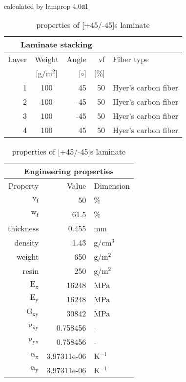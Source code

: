 \begin{table}[!htbp]
  \renewcommand{\arraystretch}{1.2}
  \caption{\label{tab:[+45/-45]s laminate}properties of [+45/-45]s laminate}
  \centering\footnotesize{\rule{0pt}{10pt}
  \tiny calculated by lamprop 4.0α1\\[3pt]}
    \begin{tabular}[t]{rcrrl}
      \multicolumn{4}{c}{\small\textbf{Laminate stacking}}\\[0.1em]
      \toprule %
      Layer & Weight & Angle & vf & Fiber type\\
            & [g/m$^2$] & [$\circ$] & [\%]\\
      \midrule
      1 &  100 &    45 & 50 & Hyer's carbon fiber\\
      2 &  100 &   -45 & 50 & Hyer's carbon fiber\\
      3 &  100 &   -45 & 50 & Hyer's carbon fiber\\
      4 &  100 &    45 & 50 & Hyer's carbon fiber\\
      \bottomrule
    \end{tabular}\hspace{0.02\textwidth}
    \begin{tabular}[t]{rrl}
      \multicolumn{3}{c}{\small\textbf{Engineering properties}}\\[0.1em]
      \toprule
      Property & Value & Dimension\\
      \midrule
      $\mathrm{v_f}$ & 50 &\%\\
      $\mathrm{w_f}$ & 61.5 &\%\\
      thickness & 0.455 & mm\\
      density & 1.43 & g/cm$^3$\\
      weight & 650 & g/m$^2$\\
      resin & 250 & g/m$^2$\\
      \midrule
      $\mathrm{E_x}$ &    16248 & MPa\\
      $\mathrm{E_y}$ &    16248 & MPa\\
      $\mathrm{G_{xy}}$ &    30842 & MPa\\
      $\mathrm{\nu_{xy}}$ & 0.758456 &-\\
      $\mathrm{\nu_{yx}}$ & 0.758456 &-\\
      $\mathrm{\alpha_x}$ & 3.97311e-06 & K$^{-1}$\\
      $\mathrm{\alpha_y}$ & 3.97311e-06 & K$^{-1}$\\
      \bottomrule
    \end{tabular}

\end{table}
